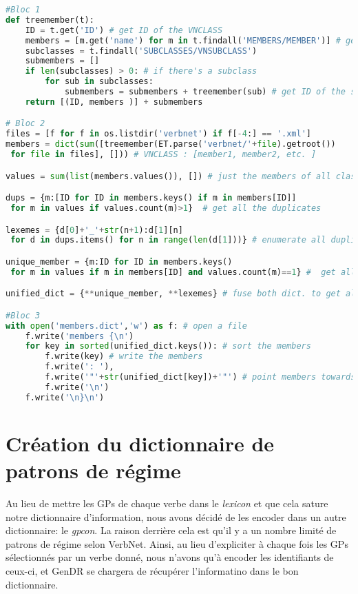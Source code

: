 \begin{lstlisting}[language=Python, caption = Ajout des membres de VerbNet, label=scriptmember]
#Bloc 1
def treemember(t):
    ID = t.get('ID') # get ID of the VNCLASS
    members = [m.get('name') for m in t.findall('MEMBERS/MEMBER')] # get members 
    subclasses = t.findall('SUBCLASSES/VNSUBCLASS')
    submembers = []
    if len(subclasses) > 0: # if there's a subclass
        for sub in subclasses:
            submembers = submembers + treemember(sub) # get ID of the subclass and members
    return [(ID, members )] + submembers

# Bloc 2
files = [f for f in os.listdir('verbnet') if f[-4:] == '.xml']
members = dict(sum([treemember(ET.parse('verbnet/'+file).getroot())
 for file in files], [])) # VNCLASS : [member1, member2, etc. ]

values = sum(list(members.values()), []) # just the members of all classes

dups = {m:[ID for ID in members.keys() if m in members[ID]]
 for m in values if values.count(m)>1}  # get all the duplicates

lexemes = {d[0]+'_'+str(n+1):d[1][n]
 for d in dups.items() for n in range(len(d[1]))} # enumerate all duplicates: eat_1, eat_2

unique_member = {m:ID for ID in members.keys() 
 for m in values if m in members[ID] and values.count(m)==1} #  get all unique lexemes

unified_dict = {**unique_member, **lexemes} # fuse both dict. to get all members disambiguated

#Bloc 3
with open('members.dict','w') as f: # open a file
    f.write('members {\n')
    for key in sorted(unified_dict.keys()): # sort the members
        f.write(key) # write the members
        f.write(': '),
        f.write('"'+str(unified_dict[key])+'"') # point members towards ID of VNCLASS
        f.write('\n')
    f.write('\n}\n')

\end{lstlisting}

\section{Création du dictionnaire de patrons de régime}

Au lieu de mettre les \acp{GP} de chaque verbe dans le \emph{lexicon} et que cela sature notre dictionnaire d'information, nous avons décidé de les encoder dans un autre dictionnaire: le \emph{gpcon}. La raison derrière cela est qu'il y a un nombre limité de patrons de régime selon VerbNet. Ainsi, au lieu d'expliciter à chaque fois les \acp{GP} sélectionnés par un verbe donné, nous n'avons qu'à encoder les identifiants de ceux-ci, et GenDR se chargera de récupérer l'informatino dans le bon dictionnaire. 

